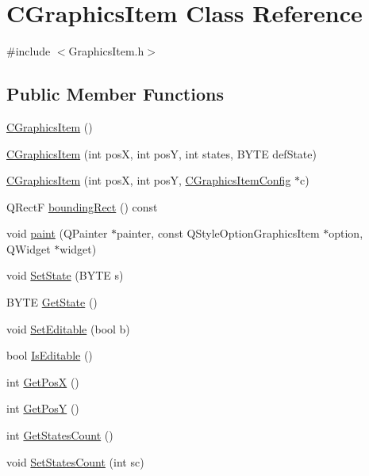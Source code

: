 \hypertarget{classCGraphicsItem}{
\section{CGraphicsItem Class Reference}
\label{classCGraphicsItem}
}


{\ttfamily \#include $<$GraphicsItem.h$>$}\subsection*{Public Member Functions}
\begin{DoxyCompactItemize}
\item 
\hyperlink{classCGraphicsItem_ae1cfa0f541eadcf6a72d23c0386d80ac}{CGraphicsItem} ()
\item 
\hyperlink{classCGraphicsItem_ac6af1bfd1ec6e5d42ee0590dffcd920f}{CGraphicsItem} (int posX, int posY, int states, BYTE defState)
\item 
\hyperlink{classCGraphicsItem_aaf9e5d412117ffdbe047ab45ba4f32b4}{CGraphicsItem} (int posX, int posY, \hyperlink{classCGraphicsItemConfig}{CGraphicsItemConfig} $\ast$c)
\item 
QRectF \hyperlink{classCGraphicsItem_abe95249eb365a95ba48f98d716081d1c}{boundingRect} () const 
\item 
void \hyperlink{classCGraphicsItem_ad417dbdb6e271454a8e18cddde6867ea}{paint} (QPainter $\ast$painter, const QStyleOptionGraphicsItem $\ast$option, QWidget $\ast$widget)
\item 
void \hyperlink{classCGraphicsItem_a356ca18291bc9ef8ae5e764c9d8bfb1a}{SetState} (BYTE s)
\item 
BYTE \hyperlink{classCGraphicsItem_afdb90d7fa1103b248678df935c323078}{GetState} ()
\item 
void \hyperlink{classCGraphicsItem_a58c3123bfe6213f33e9fcb0f39984be4}{SetEditable} (bool b)
\item 
bool \hyperlink{classCGraphicsItem_aa116ef0415c22d54e9a56617184d7de8}{IsEditable} ()
\item 
int \hyperlink{classCGraphicsItem_a71cf5e1e005071bc98346dfd688bb5ae}{GetPosX} ()
\item 
int \hyperlink{classCGraphicsItem_a0027198ae4260474a36bbbb55d55184b}{GetPosY} ()
\item 
int \hyperlink{classCGraphicsItem_af302d0c5f3b0978e34a90b8540de2bc0}{GetStatesCount} ()
\item 
void \hyperlink{classCGraphicsItem_a4c3f6d8b84fad5e303f0fa29a4007aee}{SetStatesCount} (int sc)
\end{DoxyCompactItemize}
